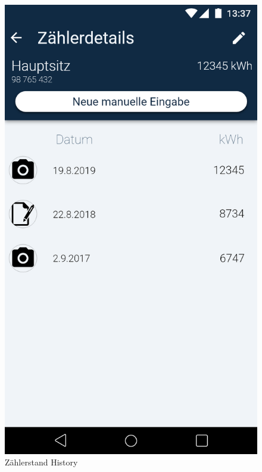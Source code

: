 \begin{figure}[h]
	\includegraphics[scale = 0.22]{img/AndroidMockup/history}		
	\caption{Zählerstand History}
	\label{fig:mock-pw}
\end{figure}

